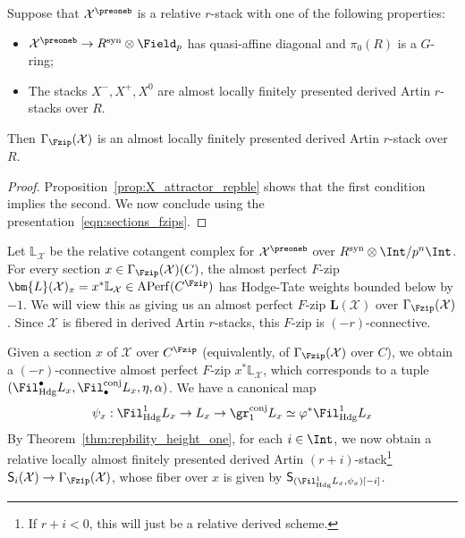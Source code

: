 \documentclass[10pt]{amsart}
\begin{document}
\begin{lemma}
\label{lem:FZip_repblity}
Suppose that $\mathcal{X}^\preoneb$ is a relative $r$-stack with one of the following properties: 
\begin{itemize}
   \item $\mathcal{X}^\preoneb\to R^{\mathrm{syn}}\otimes\Field_p$ has quasi-affine diagonal and $\pi_0(R)$ is a $G$-ring;

   \item The stacks $X^-,X^+,X^0$ are almost locally finitely presented derived Artin $r$-stacks over $R$.
\end{itemize}
Then $\Gamma_{\Fzip}(\mathcal{X})$ is an almost locally finitely presented derived Artin $r$-stack over $R$.
\end{lemma}
\begin{proof}
Proposition~\ref{prop:X_attractor_repble} shows that the first condition implies the second. We now conclude using the presentation~\eqref{eqn:sections_fzips}.
\end{proof}

\begin{remark}
Let $\mathbb{L}_{\mathcal{X}}$ be the relative cotangent complex for $\mathcal{X}^\preoneb$ over $R^{\mathrm{syn}}\otimes\Int/p^n\Int$. For every section $x\in \Gamma_{\Fzip}(\mathcal{X})(C)$, the almost perfect $F$-zip $\bm{L}(\mathcal{X})_x = x^*\mathbb{L}_{\mathcal{X}}\in \mathrm{APerf}(C^{\Fzip})$ has Hodge-Tate weights bounded below by $-1$. We will view this as giving us an almost perfect $F$-zip $\bm{L}(\mathcal{X})$ over $\Gamma_{\mathrm{\Fzip}}(\mathcal{X})$. Since $\mathcal{X}$ is fibered in derived Artin $r$-stacks, this $F$-zip is $(-r)$-connective. 
\end{remark}

\begin{construction}
\label{const:S1_mathcal_X}
Given a section $x$ of $\mathcal{X}$ over $C^{\Fzip}$ (equivalently, of $\Gamma_{\Fzip}(\mathcal{X})$ over $C$), we obtain a $(-r)$-connective almost perfect $F$-zip $x^*\mathbb{L}_{\mathcal{X}}$, which corresponds to a tuple $(\Fil^\bullet_{\mathrm{Hdg}}L_x,\Fil^{\mathrm{conj}}_\bullet L_x,\eta,\alpha)$. We have a canonical map
\begin{align}
\label{eqn:phi_module_1bdd_definition}
\psi_x:\Fil^1_{\mathrm{Hdg}}L_x \to L_x \to \gr^{\mathrm{conj}}_1L_x \simeq \varphi^*\Fil^1_{\mathrm{Hdg}}L_x
\end{align}
By Theorem~\ref{thm:repbility_height_one}, for each $i\in \Int$, we now obtain a relative locally almost finitely presented derived Artin $(r+i)$-stack\footnote{If $r+i<0$, this will just be a relative derived scheme.} $\mathsf{S}_i(\mathcal{X})\to \Gamma_{\Fzip}(\mathcal{X})$, whose fiber over $x$ is given by $\mathsf{S}_{(\Fil^1_{\mathrm{Hdg}}L_x,\psi_x)[-i]}$.
\end{construction}
\end{document}
